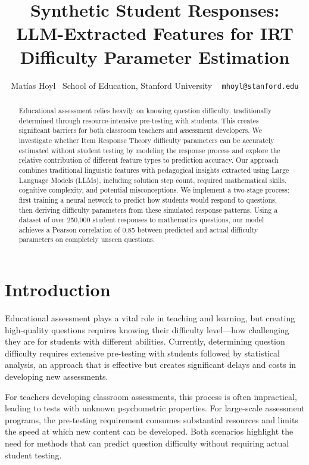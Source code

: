 \documentclass[11pt]{article}
\title{Synthetic Student Responses: LLM-Extracted Features for IRT Difficulty Parameter Estimation}
\author{Matías Hoyl \
  School of Education, Stanford University \
  \texttt{mhoyl@stanford.edu}}
\begin{document}
\maketitle
\begin{abstract}
Educational assessment relies heavily on knowing question difficulty, traditionally determined through resource-intensive pre-testing with students. This creates significant barriers for both classroom teachers and assessment developers. We investigate whether Item Response Theory difficulty parameters can be accurately estimated without student testing by modeling the response process and explore the relative contribution of different feature types to prediction accuracy. Our approach combines traditional linguistic features with pedagogical insights extracted using Large Language Models (LLMs), including solution step count, required mathematical skills, cognitive complexity, and potential misconceptions. We implement a two-stage process: first training a neural network to predict how students would respond to questions, then deriving difficulty parameters from these simulated response patterns. Using a dataset of over 250,000 student responses to mathematics questions, our model achieves a Pearson correlation of 0.85 between predicted and actual difficulty parameters on completely unseen questions. 
\end{abstract}

\section{Introduction}

Educational assessment plays a vital role in teaching and learning, but creating high-quality questions requires knowing their difficulty level—how challenging they are for students with different abilities. Currently, determining question difficulty requires extensive pre-testing with students followed by statistical analysis, an approach that is effective but creates significant delays and costs in developing new assessments.

For teachers developing classroom assessments, this process is often impractical, leading to tests with unknown psychometric properties. For large-scale assessment programs, the pre-testing requirement consumes substantial resources and limits the speed at which new content can be developed. Both scenarios highlight the need for methods that can predict question difficulty without requiring actual student testing.
\end{document}
